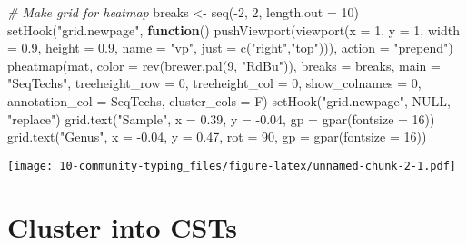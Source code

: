 \documentclass[
  oneside]{book}
\newenvironment{Shaded}{\begin{snugshade}}{\end{snugshade}}
\newcommand{\AttributeTok}[1]{\textcolor[rgb]{0.77,0.63,0.00}{#1}}
\newcommand{\CommentTok}[1]{\textcolor[rgb]{0.56,0.35,0.01}{\textit{#1}}}
\newcommand{\ConstantTok}[1]{\textcolor[rgb]{0.00,0.00,0.00}{#1}}
\newcommand{\ControlFlowTok}[1]{\textcolor[rgb]{0.13,0.29,0.53}{\textbf{#1}}}
\newcommand{\DecValTok}[1]{\textcolor[rgb]{0.00,0.00,0.81}{#1}}
\newcommand{\FloatTok}[1]{\textcolor[rgb]{0.00,0.00,0.81}{#1}}
\newcommand{\FunctionTok}[1]{\textcolor[rgb]{0.00,0.00,0.00}{#1}}
\newcommand{\NormalTok}[1]{#1}
\newcommand{\OtherTok}[1]{\textcolor[rgb]{0.56,0.35,0.01}{#1}}
\newcommand{\SpecialCharTok}[1]{\textcolor[rgb]{0.00,0.00,0.00}{#1}}
\newcommand{\StringTok}[1]{\textcolor[rgb]{0.31,0.60,0.02}{#1}}
\begin{document}
\begin{Shaded}
\begin{Highlighting}[]
\CommentTok{\# Make grid for heatmap}
\NormalTok{breaks }\OtherTok{\textless{}{-}} \FunctionTok{seq}\NormalTok{(}\SpecialCharTok{{-}}\DecValTok{2}\NormalTok{, }\DecValTok{2}\NormalTok{, }\AttributeTok{length.out =} \DecValTok{10}\NormalTok{)}
\FunctionTok{setHook}\NormalTok{(}\StringTok{"grid.newpage"}\NormalTok{, }\ControlFlowTok{function}\NormalTok{() }\FunctionTok{pushViewport}\NormalTok{(}\FunctionTok{viewport}\NormalTok{(}\AttributeTok{x =} \DecValTok{1}\NormalTok{, }\AttributeTok{y =} \DecValTok{1}\NormalTok{, }\AttributeTok{width =} \FloatTok{0.9}\NormalTok{, }
                                                         \AttributeTok{height =} \FloatTok{0.9}\NormalTok{, }\AttributeTok{name =} \StringTok{"vp"}\NormalTok{, }
                                                         \AttributeTok{just =} \FunctionTok{c}\NormalTok{(}\StringTok{"right"}\NormalTok{,}\StringTok{"top"}\NormalTok{))), }
        \AttributeTok{action =} \StringTok{"prepend"}\NormalTok{)}
\FunctionTok{pheatmap}\NormalTok{(mat, }\AttributeTok{color =} \FunctionTok{rev}\NormalTok{(}\FunctionTok{brewer.pal}\NormalTok{(}\DecValTok{9}\NormalTok{, }\StringTok{"RdBu"}\NormalTok{)), }\AttributeTok{breaks =}\NormalTok{ breaks, }\AttributeTok{main =} \StringTok{"SeqTechs"}\NormalTok{, }\AttributeTok{treeheight\_row =} \DecValTok{0}\NormalTok{, }\AttributeTok{treeheight\_col =} \DecValTok{0}\NormalTok{, }\AttributeTok{show\_colnames =} \DecValTok{0}\NormalTok{, }\AttributeTok{annotation\_col =}\NormalTok{ SeqTechs, }\AttributeTok{cluster\_cols =}\NormalTok{ F)}
\FunctionTok{setHook}\NormalTok{(}\StringTok{"grid.newpage"}\NormalTok{, }\ConstantTok{NULL}\NormalTok{, }\StringTok{"replace"}\NormalTok{)}
\FunctionTok{grid.text}\NormalTok{(}\StringTok{"Sample"}\NormalTok{, }\AttributeTok{x =} \FloatTok{0.39}\NormalTok{, }\AttributeTok{y =} \SpecialCharTok{{-}}\FloatTok{0.04}\NormalTok{, }\AttributeTok{gp =} \FunctionTok{gpar}\NormalTok{(}\AttributeTok{fontsize =} \DecValTok{16}\NormalTok{))}
\FunctionTok{grid.text}\NormalTok{(}\StringTok{"Genus"}\NormalTok{, }\AttributeTok{x =} \SpecialCharTok{{-}}\FloatTok{0.04}\NormalTok{, }\AttributeTok{y =} \FloatTok{0.47}\NormalTok{, }\AttributeTok{rot =} \DecValTok{90}\NormalTok{, }\AttributeTok{gp =} \FunctionTok{gpar}\NormalTok{(}\AttributeTok{fontsize =} \DecValTok{16}\NormalTok{))}
\end{Highlighting}
\end{Shaded}

\texttt{[image: 10-community-typing\_files/figure-latex/unnamed-chunk-2-1.pdf]}

\hypertarget{cluster-into-csts}{%
\section{Cluster into CSTs}\label{cluster-into-csts}}
\end{document}
